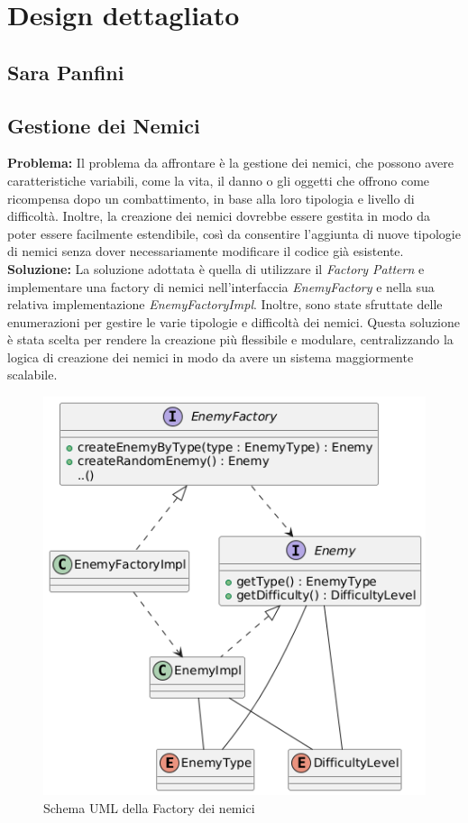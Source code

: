 \documentclass[a4paper,12pt]{report}
\begin{document}
\section{Design dettagliato}

\subsection{Sara Panfini}
\subsection{\textbf{Gestione dei Nemici}}
\textbf{Problema:} Il problema da affrontare è la gestione dei nemici, che possono avere caratteristiche variabili, come
la vita, il danno o gli oggetti che offrono come ricompensa dopo un combattimento, in base alla loro tipologia e livello di difficoltà.
Inoltre, la creazione dei nemici dovrebbe essere gestita in modo da poter essere facilmente estendibile, così da consentire l'aggiunta
di nuove tipologie di nemici senza dover necessariamente modificare il codice già esistente.\newline
\textbf{Soluzione:} La soluzione adottata è quella di utilizzare il \textit{Factory Pattern} e implementare una factory di nemici nell'interfaccia
\textit{EnemyFactory} e nella sua relativa implementazione \textit{EnemyFactoryImpl}. Inoltre, sono state sfruttate delle enumerazioni per
gestire le varie tipologie e difficoltà dei nemici. Questa soluzione è stata scelta per rendere la creazione più flessibile e modulare, centralizzando
la logica di creazione dei nemici in modo da avere un sistema maggiormente scalabile.\newline

\begin{figure}[H]
	\centering{}
	\includegraphics[width=\textwidth]{img/EnemyUML.png}
	\caption{Schema UML della Factory dei nemici}
\end{figure}
\end{document}
